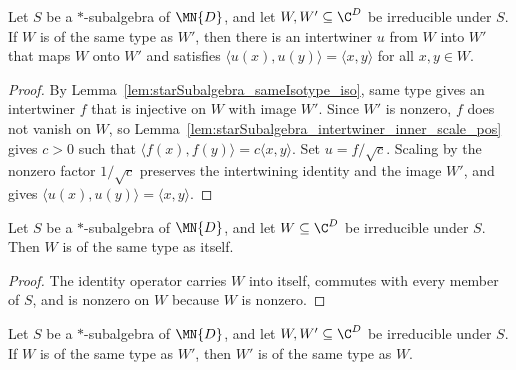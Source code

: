 \begin{lemma}%
    \label{lem:starSubalgebra_sameIsotype_isometry}
    \leanok
    Let $S$ be a $*$-subalgebra of $\MN{D}$, and let
    $W,W'\subseteq\C^D$ be irreducible under $S$. If $W$ is of the same
    type as $W'$, then there is an intertwiner $u$ from $W$ into $W'$ that
    maps $W$ onto $W'$ and satisfies
    $\langle u(x),u(y)\rangle=\langle x,y\rangle$ for all $x,y\in W$.
\end{lemma}

\begin{proof}
    \leanok
    By Lemma~\ref{lem:starSubalgebra_sameIsotype_iso}, same type gives an
    intertwiner $f$ that is injective on $W$ with image $W'$. Since $W'$
    is nonzero, $f$ does not vanish on $W$, so
    Lemma~\ref{lem:starSubalgebra_intertwiner_inner_scale_pos} gives
    $c>0$ such that
    $\langle f(x),f(y)\rangle=c\langle x,y\rangle$. Set
    $u=f/\sqrt{c}$. Scaling by the nonzero factor $1/\sqrt{c}$ preserves
    the intertwining identity and the image $W'$, and gives
    $\langle u(x),u(y)\rangle=\langle x,y\rangle$.
\end{proof}

\begin{lemma}%
    \label{lem:starSubalgebra_sameIsotype_refl}
    \leanok
    Let $S$ be a $*$-subalgebra of $\MN{D}$, and let
    $W\subseteq\C^D$ be irreducible under $S$. Then $W$ is of the same
    type as itself.
\end{lemma}

\begin{proof}
    \leanok
    The identity operator carries $W$ into itself, commutes with every member
    of $S$, and is nonzero on $W$ because $W$ is nonzero.
\end{proof}

\begin{lemma}%
    \label{lem:starSubalgebra_sameIsotype_symm}
    \leanok
    Let $S$ be a $*$-subalgebra of $\MN{D}$, and let
    $W,W'\subseteq\C^D$ be irreducible under $S$. If $W$ is of the same
    type as $W'$, then $W'$ is of the same type as $W$.
\end{lemma}

